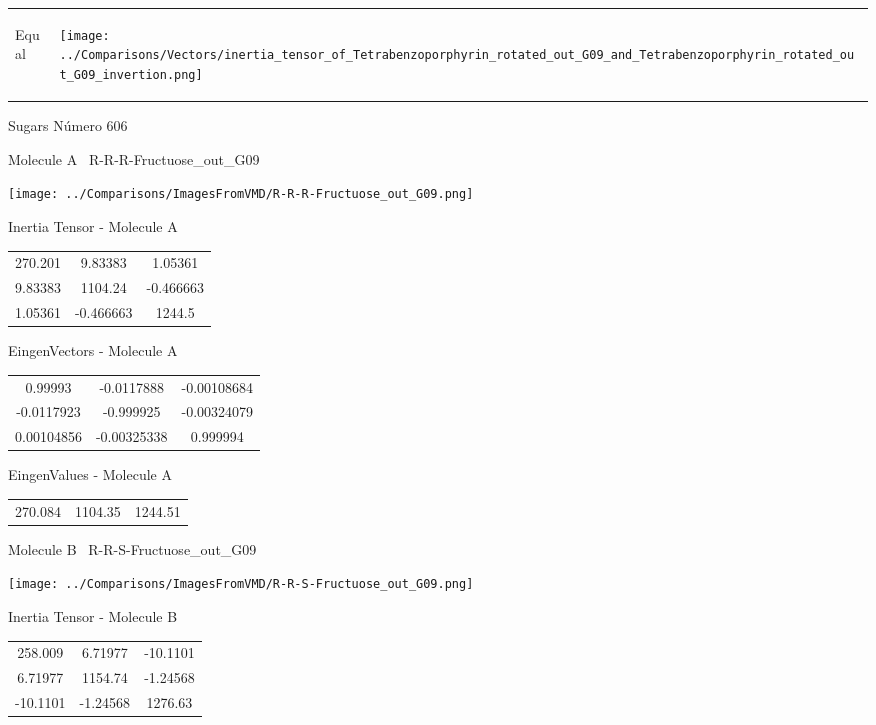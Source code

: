 \vtab[-5mm]
\begin{tabular}{*{2}{m{}}}
\begin{center}
\textcolor{NavyBlue}{\Large Equal}
\end{center}
&
\begin{center}
\texttt{[image: ../Comparisons/Vectors/inertia\_tensor\_of\_Tetrabenzoporphyrin\_rotated\_out\_G09\_and\_Tetrabenzoporphyrin\_rotated\_out\_G09\_invertion.png]}
\end{center}
\end{tabular}

 \newpage

\vtab[-3cm]
\begin{center}
{\large Sugars \tab Número 606}
\end{center}
\begin{multicols}{2}
\begin{center}

Molecule A \
R-R-R-Fructuose\_out\_G09

\texttt{[image: ../Comparisons/ImagesFromVMD/R-R-R-Fructuose\_out\_G09.png]}

Inertia Tensor - Molecule A \\
\begin{tabular}{|c c c|}
270.201	 & 	9.83383	 & 	1.05361	 \\
9.83383	 & 	1104.24	 & 	-0.466663	 \\
1.05361	 & 	-0.466663	 & 	1244.5
\end{tabular}

\vtab
 EingenVectors - Molecule A     \\
\begin{tabular}{|c c c|}
0.99993	 & 	-0.0117888	 & 	-0.00108684	 \\
-0.0117923	 & 	-0.999925	 & 	-0.00324079	 \\
0.00104856	 & 	-0.00325338	 & 	0.999994
\end{tabular}

\vtab
 EingenValues - Molecule A     \\
\begin{tabular}{|c c c|}
270.084	 & 	1104.35	 & 	1244.51	 \\
\end{tabular}
\columnbreak

Molecule B \
R-R-S-Fructuose\_out\_G09

\texttt{[image: ../Comparisons/ImagesFromVMD/R-R-S-Fructuose\_out\_G09.png]}

Inertia Tensor - Molecule B \\
\begin{tabular}{|c c c|}
258.009	 & 	6.71977	 & 	-10.1101	 \\
6.71977	 & 	1154.74	 & 	-1.24568	 \\
-10.1101	 & 	-1.24568	 & 	1276.63
\end{tabular}


\end{center}
\end{multicols}
